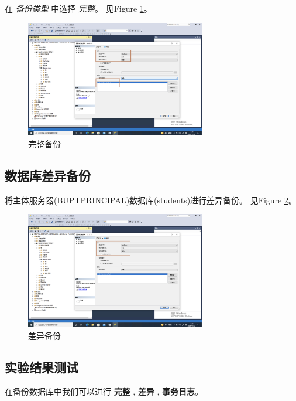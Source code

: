 \documentclass[onecolumn,oneside]{BUPTHomework}
\begin{document}
  在 \textit{备份类型} 中选择 \textit{完整}。
  见Figure \ref{pic4}。

  \newpage

  \begin{figure}[h]
    \centering
    \includegraphics[width=0.70\textwidth]{image/pic4.png}
    \caption{完整备份}
    \label{pic4}
  \end{figure}

  \subsection{数据库差异备份}

  将主体服务器(BUPTPRINCIPAL)数据库(students)进行差异备份。
  见Figure \ref{pic5}。

  \begin{figure}[h]
    \centering
    \includegraphics[width=0.70\textwidth]{image/pic5.png}
    \caption{差异备份}
    \label{pic5}
  \end{figure}

  \subsection{实验结果测试}

  在备份数据库中我们可以进行 \textbf{完整} , \textbf{差异} , \textbf{事务日志}。
\end{document}
